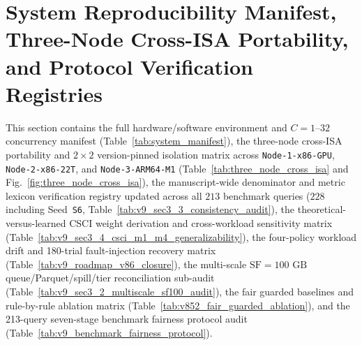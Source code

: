 \documentclass[10pt,a4paper]{article}
\begin{document}
\clearpage
\section{System Reproducibility Manifest, Three-Node Cross-ISA Portability, and Protocol Verification Registries}
This section contains the full hardware/software environment and $C=1\text{--}32$ concurrency manifest (Table~\ref{tab:system_manifest}), the three-node cross-ISA portability and $2\times 2$ version-pinned isolation matrix across \texttt{Node-1-x86-GPU}, \texttt{Node-2-x86-22T}, and \texttt{Node-3-ARM64-M1} (Table~\ref{tab:three_node_cross_isa} and Fig.~\ref{fig:three_node_cross_isa}), the manuscript-wide denominator and metric lexicon verification registry updated across all $213$ benchmark queries ($228$ including Seed~\texttt{S6}, Table~\ref{tab:v9_sec3_3_consistency_audit}), the theoretical-versus-learned CSCI weight derivation and cross-workload sensitivity matrix (Table~\ref{tab:v9_sec3_4_csci_m1_m4_generalizability}), the four-policy workload drift and 180-trial fault-injection recovery matrix (Table~\ref{tab:v9_roadmap_v86_closure}), the multi-scale $\text{SF}=100\text{ GB}$ queue/Parquet/spill/tier reconciliation sub-audit (Table~\ref{tab:v9_sec3_2_multiscale_sf100_audit}), the fair guarded baselines and rule-by-rule ablation matrix (Table~\ref{tab:v852_fair_guarded_ablation}), and the 213-query seven-stage benchmark fairness protocol audit (Table~\ref{tab:v9_benchmark_fairness_protocol}).
\end{document}
